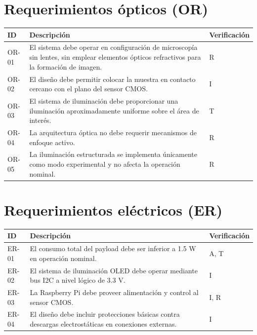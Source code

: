 \section{Requerimientos ópticos (OR)}
\renewcommand{\arraystretch}{1.3}

\begin{longtable}{p{1.2cm} p{10.3cm} p{2.5cm}}
\toprule
\textbf{ID} & \textbf{Descripción} & \textbf{Verificación} \\
\midrule
OR-01 & El sistema debe operar en configuración de microscopía sin lentes, sin
emplear elementos ópticos refractivos para la formación de imagen. & R \\
OR-02 & El diseño debe permitir colocar la muestra en contacto cercano con el
plano del sensor CMOS. & I \\
OR-03 & El sistema de iluminación debe proporcionar una iluminación
aproximadamente uniforme sobre el área de interés. & T \\
OR-04 & La arquitectura óptica no debe requerir mecanismos de enfoque activo. & R \\
OR-05 & La iluminación estructurada se implementa únicamente como modo
experimental y no afecta la operación nominal. & R \\
\bottomrule
\end{longtable}
\renewcommand{\arraystretch}{1}

\section{Requerimientos eléctricos (ER)}
\renewcommand{\arraystretch}{1.3}

\begin{longtable}{p{1.2cm} p{10.3cm} p{2.5cm}}
\toprule
\textbf{ID} & \textbf{Descripción} & \textbf{Verificación} \\
\midrule
ER-01 & El consumo total del payload debe ser inferior a 1.5 W en operación
nominal. & A, T \\
ER-02 & El sistema de iluminación OLED debe operar mediante bus I2C a nivel
lógico de 3.3 V. & I \\
ER-03 & La Raspberry Pi debe proveer alimentación y control al sensor CMOS. & I, R \\
ER-04 & El diseño debe incluir protecciones básicas contra descargas
electrostáticas en conexiones externas. & I \\
\bottomrule
\end{longtable}
\renewcommand{\arraystretch}{1}

